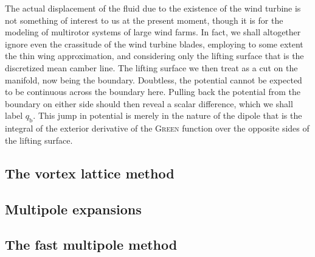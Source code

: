 The actual displacement of the fluid due to the existence of the wind turbine is not something of interest to us at the present moment, though it is for the modeling of multirotor systems of large wind farms.
In fact, we shall altogether ignore even the crassitude of the wind turbine blades, employing to some extent the thin wing approximation, and considering only the lifting surface that is the discretized mean camber line.
The lifting surface we then treat as a cut on the manifold, now being the boundary.
Doubtless, the potential cannot be expected to be continuous across the boundary here.
Pulling back the potential from the boundary on either side should then reveal a scalar difference, which we shall label $q_{\mathrm{b}}$.
This jump in potential is merely in the nature of the dipole that is the integral of the exterior derivative of the \textsc{Green} function over the opposite sides of the lifting surface.

\subsection{The vortex lattice method}


\subsection{Multipole expansions}


\subsection{The fast multipole method}

